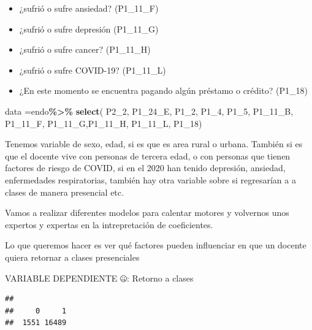 \documentclass[
]{article}
\newenvironment{Shaded}{\begin{snugshade}}{\end{snugshade}}
\newcommand{\FunctionTok}[1]{\textcolor[rgb]{0.13,0.29,0.53}{\textbf{#1}}}
\newcommand{\NormalTok}[1]{#1}
\newcommand{\OtherTok}[1]{\textcolor[rgb]{0.56,0.35,0.01}{#1}}
\newcommand{\SpecialCharTok}[1]{\textcolor[rgb]{0.81,0.36,0.00}{\textbf{#1}}}
\newcommand{\StringTok}[1]{\textcolor[rgb]{0.31,0.60,0.02}{#1}}
\begin{document}
\begin{itemize}
\item
  ¿sufrió o sufre ansiedad? (P1\_11\_F)
\item
  ¿sufrió o sufre depresión (P1\_11\_G)
\item
  ¿sufrió o sufre cancer? (P1\_11\_H)
\item
  ¿sufrió o sufre COVID-19? (P1\_11\_L)
\item
  ¿En este momento se encuentra pagando algún préstamo o crédito?
  (P1\_18)
\end{itemize}

\begin{Shaded}
\begin{Highlighting}[]
\NormalTok{data }\OtherTok{=}\NormalTok{endo}\SpecialCharTok{\%\textgreater{}\%} 
       \FunctionTok{select}\NormalTok{( P2\_2, P1\_24\_E, P1\_2, P1\_4, P1\_5, P1\_11\_B, P1\_11\_F, P1\_11\_G,P1\_11\_H, P1\_11\_L, P1\_18)}
\end{Highlighting}
\end{Shaded}

Tenemos variable de sexo, edad, si es que es area rural o urbana.
También si es que el docente vive con personas de tercera edad, o con
personas que tienen factores de riesgo de COVID, si en el 2020 han
tenido depresión, ansiedad, enfermedades respiratorias, también hay otra
variable sobre si regresarían a a clases de manera presencial etc.

Vamos a realizar diferentes modelos para calentar motores y volvernos
unos expertos y expertas en la intrepretación de coeficientes.

Lo que queremos hacer es ver qué factores pueden influenciar en que un
docente quiera retornar a clases presenciales

VARIABLE DEPENDIENTE 🤐: Retorno a clases

\begin{Shaded}
\end{Shaded}

\begin{verbatim}
## 
##     0     1 
##  1551 16489
\end{verbatim}

\begin{Shaded}
\end{Shaded}
\end{document}
